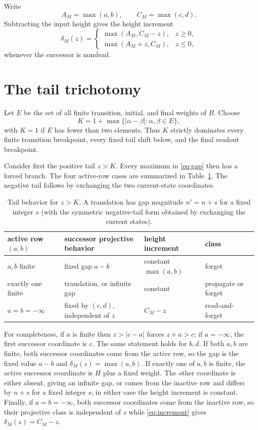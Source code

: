 \documentclass[11pt]{article}
\newcommand{\minf}{-\infty}
\begin{document}
Write
\[
A_M=\max(a,b),\qquad C_M=\max(c,d).
\]
Subtracting the input height gives the height increment
\begin{equation}\label{eq:increment}
\delta_M(z)=
\begin{cases}
\max(A_M,C_M-z), & z\geq0,\\
\max(A_M+z,C_M), & z\leq0,
\end{cases}
\end{equation}
whenever the successor is nondead.

\section{The tail trichotomy}

Let $E$ be the set of all finite transition, initial, and final weights of $B$. Choose
\begin{equation}\label{eq:K}
K=1+\max\{|\alpha-\beta|:\alpha,\beta\in E\},
\end{equation}
with $K=1$ if $E$ has fewer than two elements. Thus $K$ strictly dominates every finite transition breakpoint, every fixed tail shift below, and the final readout breakpoint.

Consider first the positive tail $z>K$. Every maximum in \eqref{eq:gap} then has a forced branch. The four active-row cases are summarized in Table~\ref{tab:tail}. The negative tail follows by exchanging the two current-state coordinates.

\begin{table}[ht]
\centering
\small
\begin{tabular}{@{}llll@{}}
\toprule
active row $(a,b)$ & successor projective behavior & height increment & class \\
\midrule
$a,b$ finite & fixed gap $a-b$ & constant $\max(a,b)$ & forget \\
exactly one finite & translation, or infinite gap & constant & propagate or forget \\
$a=b=\minf$ & fixed by $(c,d)$, independent of $z$ & $C_M-z$ & read-and-forget \\
\bottomrule
\end{tabular}
\caption{Tail behavior for $z>K$. A translation has gap magnitude $n'=n+s$ for a fixed integer $s$ (with the symmetric negative-tail form obtained by exchanging the current states).}
\label{tab:tail}
\end{table}

For completeness, if $a$ is finite then $z>|c-a|$ forces $z+a>c$; if $a=\minf$, the first successor coordinate is $c$. The same statement holds for $b,d$. If both $a,b$ are finite, both successor coordinates come from the active row, so the gap is the fixed value $a-b$ and $\delta_M(z)=\max(a,b)$. If exactly one of $a,b$ is finite, the active successor coordinate is $H$ plus a fixed weight. The other coordinate is either absent, giving an infinite gap, or comes from the inactive row and differs by $n+s$ for a fixed integer $s$; in either case the height increment is constant. Finally, if $a=b=\minf$, both successor coordinates come from the inactive row, so their projective class is independent of $z$ while \eqref{eq:increment} gives $\delta_M(z)=C_M-z$.
\end{document}
